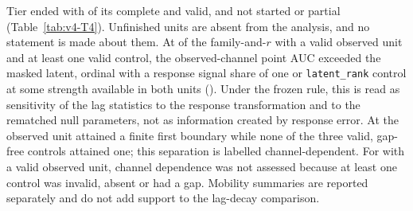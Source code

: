 Tier  ended with  of its   complete and valid, and  not started or partial (Table~\ref{tab:v4-T4}). %
Unfinished units are absent from the analysis, and no statement is made about them. %
At  of the  family-and-$r$  with a valid observed unit and at least one valid control, the observed-channel point AUC exceeded the masked latent, ordinal with a response signal share of one or \texttt{latent\_rank} control at some strength available in both units (\allunitsresource). %
Under the frozen rule, this is read as sensitivity of the lag statistics to the response transformation and to the rematched null parameters, not as information created by response error. %
At   the observed unit attained a finite first boundary while none of the three valid, gap-free controls attained one; this separation is labelled channel-dependent.
For   with a valid observed unit, channel dependence was not assessed because at least one control was invalid, absent or had a gap. %
Mobility summaries are reported separately and do not add support to the lag-decay comparison. %



